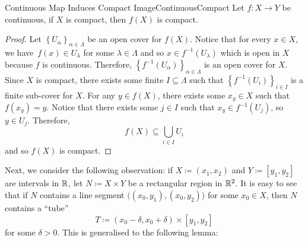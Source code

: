 \documentclass[math]{amznotes}
\theoremstyle{remark}
\begin{document}
\begin{probox}{Continuous Map Induces Compact Image}{ContinuousCompact}
    Let $f \colon X \to Y$ be continuous, if $X$ is compact, then $f\left(X\right)$ is compact.
    \tcblower
    \begin{proof}
        Let $\left\{U_{\alpha}\right\}_{\alpha \in \Lambda}$ be an open cover for $f\left(X\right)$. Notice that for every $x \in X$, we have~$f\left(x\right) \in U_{\lambda}$ for some $\lambda \in \Lambda$ and so $x \in f^{-1}\left(U_{\lambda}\right)$ which is open in $X$ because $f$ is continuous. Therefore, $\left\{f^{-1}\left(U_{\alpha}\right)\right\}_{\alpha \in \Lambda}$ is an open cover for $X$. Since $X$ is compact, there exists some finite $I \subseteq \Lambda$ such that $\left\{f^{-1}\left(U_i\right)\right\}_{i \in I}$ is a finite sub-cover for $X$. For any $y \in f\left(X\right)$, there exists some $x_y \in X$ such that $f\left(x_y\right) = y$. Notice that there exists some $j \in I$ such that $x_y \in f^{-1}\left(U_j\right)$, so $y \in U_j$. Therefore, 
        \begin{equation*}
            f\left(X\right) \subseteq \bigcup_{i \in I}U_i
        \end{equation*}
        and so $f\left(X\right)$ is compact.
    \end{proof}
\end{probox}
Next, we consider the following observation: if $X \coloneqq \left(x_1, x_2\right)$ and $Y \coloneqq \left[y_1, y_2\right]$ are intervals in $\mathbb{R}$, let $N \coloneqq X \times Y$ be a rectangular region in $\mathbb{R}^2$. It is easy to see that if $N$ contains a line segment $\bigl(\left(x_0, y_1\right), \left(x_0, y_2\right)\bigr)$ for some $x_0 \in X$, then $N$ contains a ``tube'' 
\begin{equation*}
    T \coloneqq \left(x_0 - \delta, x_0 + \delta\right) \times \left[y_1, y_2\right]
\end{equation*}
for some $\delta > 0$. This is generalised to the following lemma:
\end{document}
